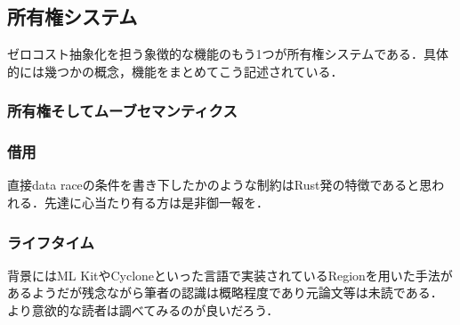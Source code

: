 \subsection{所有権システム}
ゼロコスト抽象化を担う象徴的な機能のもう1つが所有権システムである．具体的には幾つかの概念，機能をまとめてこう記述されている．

\subsubsection{所有権そしてムーブセマンティクス}

\subsubsection{借用}
直接data raceの条件を書き下したかのような制約はRust発の特徴であると思われる．先達に心当たり有る方は是非御一報を．

\subsubsection{ライフタイム}
背景にはML KitやCycloneといった言語で実装されているRegionを用いた手法があるようだが残念ながら筆者の認識は概略程度であり元論文等は未読である．
より意欲的な読者は調べてみるのが良いだろう．


